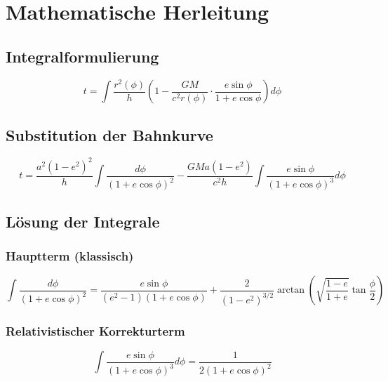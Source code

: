 \section{Mathematische Herleitung}
\subsection{Integralformulierung}
\[
t = \int \frac{r^2(\phi)}{h} \left(1 - \frac{GM}{c^2 r(\phi)} \cdot \frac{e \sin \phi}{1 + e \cos \phi}\right) d\phi
\]

\subsection{Substitution der Bahnkurve}
\[
t = \frac{a^2 (1-e^2)^2}{h} \int \frac{d\phi}{(1 + e \cos \phi)^2} - \frac{GM a (1-e^2)}{c^2 h} \int \frac{e \sin \phi}{(1 + e \cos \phi)^3} d\phi
\]

\subsection{Lösung der Integrale}
\subsubsection{Hauptterm (klassisch)}
\[
\int \frac{d\phi}{(1 + e \cos \phi)^2} = \frac{e \sin \phi}{(e^2-1)(1 + e \cos \phi)} + \frac{2}{(1-e^2)^{3/2}} \arctan\left(\sqrt{\frac{1-e}{1+e}} \tan \frac{\phi}{2}\right)
\]

\subsubsection{Relativistischer Korrekturterm}
\[
\int \frac{e \sin \phi}{(1 + e \cos \phi)^3} d\phi = \frac{1}{2(1 + e \cos \phi)^2}
\]